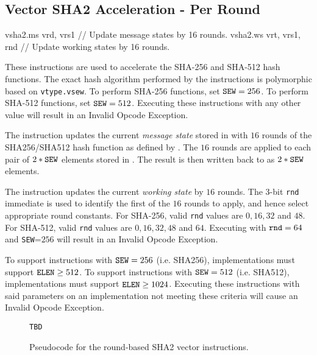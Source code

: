 
\subsection{Vector SHA2 Acceleration - Per Round}
\label{sec:vector:sha2:per-round}

\begin{cryptoisa}
vsha2.ms vrd, vrs1      // Update message states by 16 rounds.
vsha2.ws vrt, vrs1, rnd // Update working states by 16 rounds.
\end{cryptoisa}

These instructions are used to accelerate the SHA-256 and SHA-512
hash functions.
The exact hash algorithm performed by the instructions is
polymorphic based on {\tt vtype.vsew}.
To perform SHA-256 functions, set ${\tt SEW}=256$.
To perform SHA-512 functions, set ${\tt SEW}=512$.
Executing these instructions with any other \SEW value will
result in an Invalid Opcode Exception.

The  instruction updates the current {\em message state}
stored in  with $16$ rounds of the SHA256/SHA512 hash function
as defined by \SEW.
The $16$ rounds are applied to each pair of $2*{\tt SEW}$
elements stored in .
The result is then written back to \vrd as $2*{\tt SEW}$ elements.

The  instruction updates the current {\em working state}
by $16$ rounds.
The $3$-bit {\tt rnd} immediate is used to identify the first of
the $16$ rounds to apply, and hence select appropriate round constants.
For SHA-256, valid {\tt rnd} values are $0, 16, 32$   and $48$.
For SHA-512, valid {\tt rnd} values are $0, 16, 32, 48$ and $64$.
Executing  with
${\tt rnd}=64$ 
and
{\tt SEW}=$256$
will result in an Invalid Opcode Exception.


To support  instructions with ${\tt SEW}=256$ (i.e. SHA256),
implementations must support ${\tt ELEN} \ge 512$.
To support  instructions with ${\tt SEW}=512$ (i.e. SHA512),
implementations must support ${\tt ELEN} \ge 1024$.
Executing these instructions with said parameters on an implementation
not meeting these criteria will cause an Invalid Opcode Exception.

\begin{figure}[h]
\begin{lstlisting}[language=pseudo]
TBD
\end{lstlisting}
\caption{Pseudocode for the round-based SHA2 vector instructions.}
\label{fig:pseudo:sha:per-round}
\end{figure}

